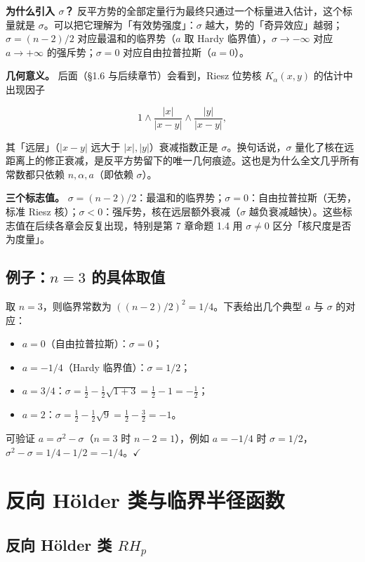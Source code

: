 \documentclass[a4paper,11pt,openany]{ctexbook}
\numberwithin{equation}{chapter}
\numberwithin{figure}{chapter}
\numberwithin{table}{chapter}
\begin{document}
\textbf{为什么引入 $\sigma$？} 反平方势的全部定量行为最终只通过一个标量进入估计，这个标量就是 $\sigma$。可以把它理解为「有效势强度」：$\sigma$ 越大，势的「奇异效应」越弱；$\sigma=(n-2)/2$ 对应最温和的临界势（$a$ 取 Hardy 临界值），$\sigma\to-\infty$ 对应 $a\to+\infty$ 的强斥势；$\sigma=0$ 对应自由拉普拉斯（$a=0$）。

\textbf{几何意义。} 后面（§1.6 与后续章节）会看到，Riesz 位势核 $K_\alpha(x,y)$ 的估计中出现因子

$$1\wedge\frac{|x|}{|x-y|}\wedge\frac{|y|}{|x-y|},$$

其「远层」（$|x-y|$ 远大于 $|x|,|y|$）衰减指数正是 $\sigma$。换句话说，$\sigma$ 量化了核在远距离上的修正衰减，是反平方势留下的唯一几何痕迹。这也是为什么全文几乎所有常数都只依赖 $n,\alpha,a$（即依赖 $\sigma$）。

\textbf{三个标志值。} $\sigma=(n-2)/2$：最温和的临界势；$\sigma=0$：自由拉普拉斯（无势，标准 Riesz 核）；$\sigma<0$：强斥势，核在远层额外衰减（$\sigma$ 越负衰减越快）。这些标志值在后续各章会反复出现，特别是第 7 章命题 1.4 用 $\sigma\neq0$ 区分「核尺度是否为度量」。

\subsection{例子：$n=3$ 的具体取值}

取 $n=3$，则临界常数为 $((n-2)/2)^2=1/4$。下表给出几个典型 $a$ 与 $\sigma$ 的对应：

\begin{itemize}
\item $a=0$（自由拉普拉斯）：$\sigma=0$；
\item $a=-1/4$（Hardy 临界值）：$\sigma=1/2$；
\item $a=3/4$：$\sigma=\frac12-\frac12\sqrt{1+3}=\frac12-1=-\frac12$；
\item $a=2$：$\sigma=\frac12-\frac12\sqrt{9}=\frac12-\frac32=-1$。
\end{itemize}

可验证 $a=\sigma^2-\sigma$（$n=3$ 时 $n-2=1$），例如 $a=-1/4$ 时 $\sigma=1/2$，$\sigma^2-\sigma=1/4-1/2=-1/4$。$\checkmark$

\section{反向 Hölder 类与临界半径函数}

\subsection{反向 Hölder 类 $RH_p$}
\end{document}
